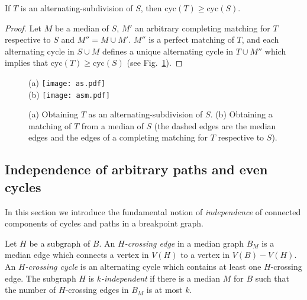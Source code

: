 \documentclass[10pt]{llncs}
\begin{document}
\begin{lemma}\label{alsub}
  If $T$ is an alternating-subdivision of $S$, then $\text{cyc}(T)
  \geq \text{cyc}(S)$.
\end{lemma}

\begin{proof}
  Let $M$ be a median of $S$, $M'$ an arbitrary completing matching
  for $T$ respective to $S$ and $M'' = M \cup M'$. $M''$ is a perfect
  matching of $T$, and each alternating cycle in $S \cup M$ defines a
  unique alternating cycle in $T \cup M''$ which implies that
  $\text{cyc}(T) \geq \text{cyc}(S)$ (see Fig.~\ref{proofalsub}).
\end{proof} 

\begin{figure}[h]
  \begin{center}(a)
    \texttt{[image: as.pdf]} \\ (b)
    \texttt{[image: asm.pdf]}
    \caption{(a) Obtaining $T$ as an alternating-subdivision of
      $S$. (b) Obtaining a matching of $T$ from a median of $S$ (the
      dashed edges are the median edges and the edges of a completing
      matching for $T$ respective to $S$).}
     \label{sub}
     \label{proofalsub}
  \end{center}
 \end{figure}








\subsection{Independence of arbitrary paths and even cycles}


In this section we introduce the fundamental notion of {\em
  independence} of connected components of cycles and paths in a
breakpoint graph. 

\begin{definition}\label{def:crossing-indep}
  Let $H$ be a subgraph of $B$. An {\em $H$-crossing
    edge} in a median graph $B_M$ is a median
  edge which connects a vertex in $V(H)$ to a vertex in $V(B) -
  V(H)$. An {\em $H$-crossing cycle} is an
  alternating cycle which contains at least one $H$-crossing edge.
  The subgraph $H$ is {\em $k$-independent} if there is a median $M$
  for $B$ such that the number of $H$-crossing edges in $B_M$ is at
  most $k$.
\end{definition}
\end{document}
